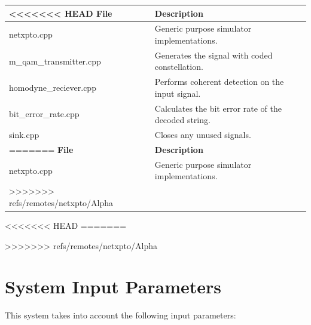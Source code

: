 \documentclass[a4paper]{article}
\begin{document}
\begin{savenotes}
\begin{table}[H]
\centering
\begin{tabulary}{1.0\textwidth}{|L|L|}
\hline
<<<<<<< HEAD
\textbf{File}              & \textbf{Description} 					   \\ \hline
netxpto.cpp                & Generic purpose simulator implementations. \\ \hline
m\_qam\_transmitter.cpp      &  Generates the signal with coded constellation. \\ \hline
homodyne\_reciever.cpp      & Performs coherent detection on the input signal.    \\ \hline
bit\_error\_rate.cpp         & Calculates the bit error rate of the decoded string. \\ \hline
sink.cpp                   & Closes any unused signals. \\ \hline
=======
\textbf{File}          & \textbf{Description} 																 \\ \hline
netxpto.cpp            & Generic purpose simulator implementations.		          										 \\
\hline
>>>>>>> refs/remotes/netxpto/Alpha
\end{tabulary}
\end{table}		
\end{savenotes}	

<<<<<<< HEAD
=======

>>>>>>> refs/remotes/netxpto/Alpha
\section{System Input Parameters}

This system takes into account the following input parameters:
\end{document}
